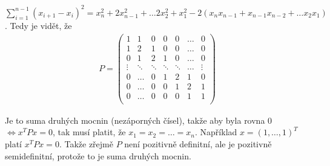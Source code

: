 \documentclass[12pt, a4paper]{article}
\begin{document}
\subsection{}
$\sum_{i=1}^{n-1} (x_{i+1}-x_{i})^2 = x^2_n + 2x^2_{n-1} + \dots 2x^2_2 + x^2_1 -2(x_nx_{n-1} + x_{n-1}x_{n-2} + \dots x_2x_1)$. Tedy je vidět, že
\begin{gather*}
P = \begin{pmatrix}
1 & 1 & 0 & 0 & 0 & \dots & 0\\
1 & 2 & 1 & 0 & 0 & \dots & 0\\
0 & 1 & 2 & 1 & 0 & \dots & 0\\
\vdots & \ddots & \ddots & \ddots & \ddots & \dots & \vdots\\
0 & \dots & 0 & 1 & 2 & 1 & 0\\
0 & \dots & 0 & 0 & 1 & 2 & 1\\
0 & \dots & 0 & 0 & 0 & 1 & 1\\
\end{pmatrix}
\end{gather*}

Je to suma druhých mocnin (nezáporných čísel), takže aby byla rovna 0 $ \iff x^TPx=0$, tak musí platit, že $x_1 = x_2 = \dots = x_n$. Například $x = (1, \dots, 1)^T$ platí $x^TPx = 0$. Takže zřejmě $P$ není pozitivně definitní, ale je pozitivně semidefinitní, protože to je suma druhých mocnin.
\end{document}
